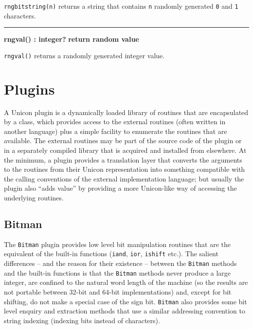 \noindent
\texttt{rngbitstring(n)} returns a string that contains \texttt{n}
randomly generated \texttt{0} and \texttt{1} characters.

\bigskip\hrule\vspace{0.1cm}
\noindent
{\bf rngval() : integer? } \hfill {\bf return random value}

\noindent
\texttt{rngval()} returns a  randomly generated integer value.

\section{Plugins}
A Unicon plugin is a dynamically loaded library of routines that are
encapsulated by a class, which provides access to the external routines (often
written in another language) plus a simple facility to enumerate the routines
that are available. The external routines may be part of the source code of the
plugin or in a separately compiled library that is acquired and installed from
elsewhere. At the minimum, a plugin provides a translation layer that converts
the arguments to the routines from their Unicon representation into something
compatible with the calling conventions of the external implementation language;
but usually the plugin also ``adds value'' by providing a more Unicon-like way
of accessing the underlying routines.

\subsection{Bitman}
The \texttt{Bitman} plugin provides low level bit manipulation routines that are
the equivalent of the built-in functions (\texttt{iand}, \texttt{ior},
\texttt{ishift} etc.). The salient differences -- and the reason for their
existence -- between the \texttt{Bitman} methods and the built-in functions is
that the \texttt{Bitman} methods never produce a large integer, are confined to
the natural word length of the machine (so the results are not portable between
32-bit and 64-bit implementations) and, except for bit shifting, do not make a
special case of the sign bit.  \texttt{Bitman} also provides some bit level
enquiry and extraction methods that use a similar addressing convention to
string indexing (indexing bits instead of characters).


